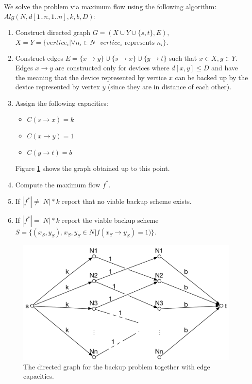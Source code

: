 We solve the problem via maximum flow using the following algorithm:
\\

$Alg(N, d[1..n, 1..n], k, b, D):$
\begin{enumerate}

	\item Construct directed graph $G=(X \cup Y \cup \{s, t\}, E)$, $ X=Y=\{ vertice_i | \forall{n_i \in N \text{ $vertice_i$ represents $n_i$}}\}$.
	
	\item Construct edges $E = \{ x \rightarrow y \} \cup \{ s \rightarrow x \} \cup \{ y \rightarrow t \}$ such that $x \in X, y \in Y$. Edges  $x \rightarrow y$ are constructed only for devices where $d[x, y] \leq D$ and have the meaning that the device represented by vertice $x$ can be backed up by the device represented by vertex $y$ (since they are in distance of each other).
	
	\item Assign the following capacities:
	\begin{itemize}
	
		\item $C(s \rightarrow x) = k$
		
		\item $C(x \rightarrow y) = 1$
		
		\item $C(y \rightarrow t) = b$
	
	\end{itemize}
	
	Figure \ref{fig:graph} shows the graph obtained up to this point.
	
	\item Compute the maximum flow $f^*$.
	
	\item If $|f^*| \neq |N| * k$ report that no viable backup scheme exists.
	
	\item If ${|f^*| = |N| * k}$ report the viable backup scheme ${S = \{ (x_S, y_S), x_S, y_S \in N | f(x_S \rightarrow y_S) = 1) \}}$.

\end{enumerate}

\begin{figure}[h!]
	\centering
		\includegraphics[width=\textwidth]{problem3}
    
	\caption{The directed graph for the backup problem together with edge capacities.}
	\label{fig:graph}
\end{figure}

